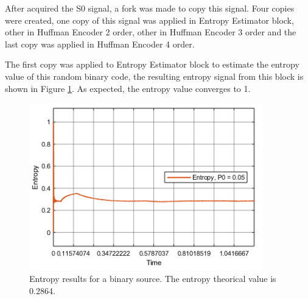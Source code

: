 \begin{refsection}
After acquired the S0 signal, a fork was made to copy this signal. Four copies were created, one copy of this signal was applied in Entropy Estimator block, other in Huffman Encoder 2 order,  other in Huffman Encoder 3 order and the last copy was applied in Huffman Encoder 4 order.

The first copy was applied to Entropy Estimator block to estimate the entropy value of this random binary code, the resulting entropy signal from this block is shown in Figure \ref{f:entropy}. As expected, the entropy value converges to 1.
\begin{figure}[!h]
\centering
\includegraphics[width=4in]{./sdf/eit_45550_estimator_source_code_efficiency/figures/entropy.png}
\caption[Entropy results for aa binary source.]{Entropy results for a binary source.  The entropy theorical value is 0.2864.}
\label{f:entropy}
\end{figure}


\end{refsection}
